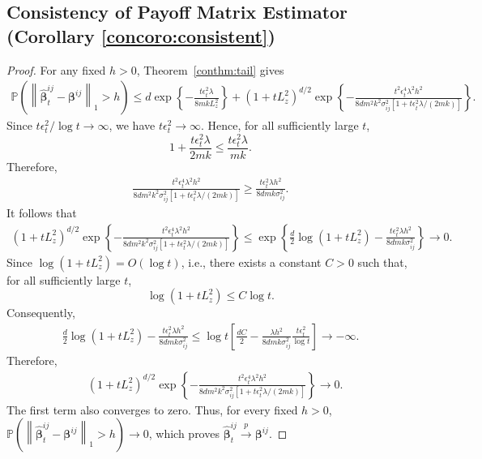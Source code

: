 \documentclass[12pt]{article}
\begin{document}
\subsection{Consistency of Payoff Matrix Estimator (Corollary \ref{concoro:consistent})}
\label{app:conthm:coro_tail_proof}
\begin{proof} 
For any fixed $h>0$, Theorem~\ref{conthm:tail} gives 
\begin{align*} 
\mathbb P\left( \left\| \widehat{\bm\beta}_t^{ij} - \bm\beta^{ij} \right\|_1 > h \right) \le d\exp\left\{ - \frac{ t\epsilon_t^2\lambda }{ 8mkL_z^2 } \right\} + \left( 1+tL_z^2 \right)^{d/2} \exp\left\{ - \frac{ t^2\epsilon_t^4\lambda^2h^2 }{ 8dm^2k^2\sigma_{ij}^2 \left[ 1+t\epsilon_t^2\lambda/(2mk) \right] } \right\}. 
\end{align*} 
Since ${ t\epsilon_t^2 }/{ \log t } \to \infty$,  we have $t\epsilon_t^2\to\infty$. Hence, for all sufficiently large $t$, 
\[ 
1+ \frac{ t\epsilon_t^2\lambda }{ 2mk } \le \frac{ t\epsilon_t^2\lambda }{ mk }. 
\] 
Therefore, 
\begin{align*} 
\frac{ t^2\epsilon_t^4\lambda^2h^2 }{ 8dm^2k^2\sigma_{ij}^2 \left[ 1+t\epsilon_t^2\lambda/(2mk) \right] } \ge \frac{ t\epsilon_t^2\lambda h^2 }{ 8dmk\sigma_{ij}^2 }. 
\end{align*} 
It follows that 
\begin{align*} 
\left( 1+tL_z^2 \right)^{d/2} \exp\left\{ - \frac{ t^2\epsilon_t^4\lambda^2h^2 }{ 8dm^2k^2\sigma_{ij}^2 \left[ 1+t\epsilon_t^2\lambda/(2mk) \right] } \right\} 
\le \exp\left\{ \frac d2 \log(1+tL_z^2) - \frac{ t\epsilon_t^2\lambda h^2 }{ 8dmk\sigma_{ij}^2 } \right\} \to0. 
\end{align*} 
Since $\log\left(1+tL_z^2 \right)= O(\log t)$, i.e., there exists a constant $C>0$ such that, for all sufficiently large $t$,
\[
\log\left(
1+tL_z^2
\right)
\le
C\log t.
\]
Consequently,
\begin{align*}
\frac d2
\log\left(
1+tL_z^2
\right)
- \frac{
t\epsilon_t^2\lambda h^2}{8dmk\sigma_{ij}^2} \le
\log t
\left[
\frac{dC}{2}
- \frac{\lambda h^2}{8dmk\sigma_{ij}^2}
\frac{t\epsilon_t^2}{\log t}
\right]
\to -\infty.
\end{align*}
Therefore,
\begin{align*}
&
\left(
1+tL_z^2
\right)^{d/2}
\exp\left\{
-
\frac{
t^2\epsilon_t^4\lambda^2h^2
}{
8dm^2k^2\sigma_{ij}^2
\left[
1+t\epsilon_t^2\lambda/(2mk)
\right]
}
\right\}
\to
0.
\end{align*}
The first term also converges to zero. Thus, for every fixed $h>0$, $\mathbb P\left( \left\| \widehat{\bm\beta}_t^{ij} - \bm\beta^{ij} \right\|_1 > h \right) \to 0$, which proves $\widehat{\bm\beta}_t^{ij} \stackrel{p}{\to} \bm\beta^{ij}$.
\end{proof}
\end{document}
